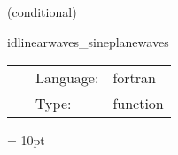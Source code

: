 \documentclass{article}
\begin{document}
\vspace{5mm}

   (conditional) 

\hspace{5mm} idlinearwaves\_sineplanewaves 

\hspace{5mm}{\it construct linear plane wave initial data } 


\hspace{5mm}

 \begin{tabular*}{160mm}{cll} 
~ & Language:  & fortran \\ 
~ & Type:  & function \\ 
\end{tabular*} 



\vspace{5mm}\parskip = 10pt 
\end{document}
